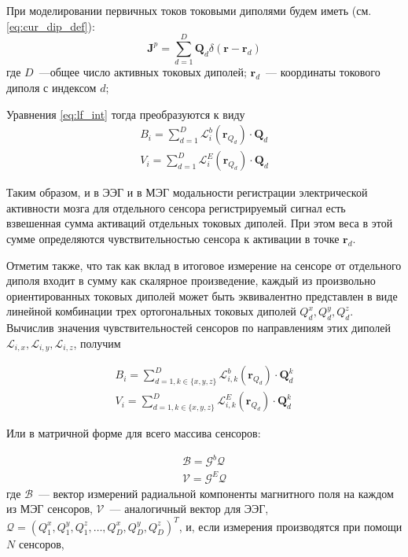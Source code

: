 При моделировании первичных токов токовыми диполями будем иметь (см. \ref{eq:cur_dip_def}):
\begin{equation}
    \mathbf{J}^p = \sum_{d=1}^D \mathbf{Q}_d \delta(\mathbf{r}-\mathbf{r}_d)
\end{equation}
где $D$~---общее число активных токовых диполей; $\mathbf{r}_d$~--- координаты токового
диполя с индексом $d$;

Уравнения \ref{eq:lf_int} тогда преобразуются к виду
\begin{gather}
    B_i = \sum_{d=1}^{D}\mathbf{\mathcal{L}}_i^b(\mathbf{r}_{Q_d})\cdot \mathbf{Q}_d\\
    V_i = \sum_{d=1}^{D}\mathbf{\mathcal{L}}_i^E(\mathbf{r}_{Q_d})\cdot \mathbf{Q}_d
\end{gather}

Таким образом, и в ЭЭГ и в МЭГ модальности регистрации электрической активности мозга
для отдельного сенсора регистрируемый сигнал есть взвешенная сумма активаций отдельных токовых диполей.
При этом веса в этой сумме определяются чувствительностью сенсора к активации в точке $\mathbf{r}_d$.

Отметим также, что так как вклад в итоговое измерение на сенсоре от отдельного диполя входит в сумму
как скалярное произведение, каждый из произвольно ориентированных токовых диполей
может быть эквивалентно представлен в виде линейной комбинации трех ортогональных токовых диполей
$Q_d^x, Q_d^y, Q_d^z$.
Вычислив значения чувствительностей сенсоров по направлениям этих диполей
$\mathcal{L}_{i,x}, \mathcal{L}_{i,y}, \mathcal{L}_{i,z}$, получим


\begin{gather}
    B_i = \sum_{d=1, k \in \{x,y,z\}}^{D}\mathbf{\mathcal{L}}_{i,k}^b(\mathbf{r}_{Q_d})\cdot \mathbf{Q}_d^k\\
    V_i = \sum_{d=1, k \in \{x,y,z\}}^{D}\mathbf{\mathcal{L}}_{i,k}^E(\mathbf{r}_{Q_d})\cdot \mathbf{Q}_d^k
\end{gather}

Или в матричной форме для всего массива сенсоров:

\begin{gather}
    \mathcal{B} = \mathcal{G}^b \mathcal{Q} \\
    \mathcal{V} = \mathcal{G}^E \mathcal{Q}
    \label{eq:BV_generative_matrix}
\end{gather}
где $\mathcal{B}$~--- вектор измерений радиальной компоненты магнитного поля на каждом из МЭГ сенсоров,
$\mathcal{V}$~--- аналогичный вектор для ЭЭГ,
$\mathcal{Q} = (Q_1^x, Q_1^y, Q_1^z, \ldots, Q_D^x, Q_D^y, Q_D^z)^T$, и, если измерения производятся при помощи
$N$ сенсоров,

